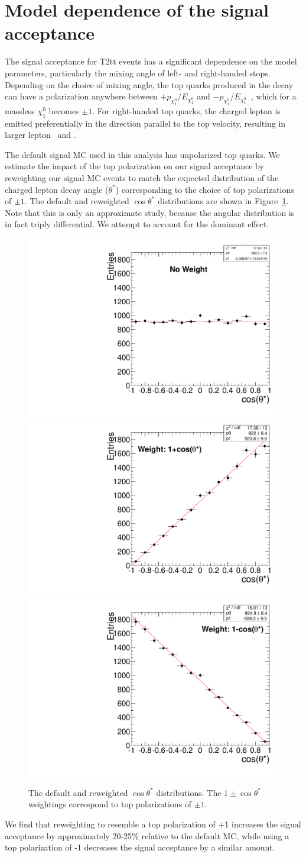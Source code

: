 \section{Model dependence of the signal acceptance}
\label{sec:modeldependence}

The signal acceptance for T2tt events has a significant dependence on the model parameters, particularly the mixing angle of left- and right-handed stops.
Depending on the choice of mixing angle, the top quarks produced in the decay can have a polarization anywhere between
$+p_{\chi_1^0}/E_{\chi_1^0}$ and $-p_{\chi_1^0}/E_{\chi_1^0}$~\cite{0811.1024}, which for a massless $\chi_1^0$ becomes $\pm 1$.
For right-handed top quarks, the charged lepton is emitted preferentially in the direction parallel to the top velocity, resulting in larger lepton \pt\ and \mt.

The default signal MC used in this analysis has unpolarized top quarks. We estimate the impact of the top polarization on our signal acceptance by reweighting
our signal MC events to match the expected distribution of the charged lepton decay angle ($\theta^{*}$) corresponding to the choice of top polarizations of $\pm 1$.
The default and reweighted $\cos\theta^{*}$ distributions are shown in Figure~\ref{fig:cosThetaStar}.
Note that this is only an approximate study, because the angular distribution is in fact triply differential. We attempt to account for the dominant effect.

\begin{figure}[hbt]
  \begin{center}
	\includegraphics[width=0.325\linewidth]{plots/costheta.pdf}
	\includegraphics[width=0.325\linewidth]{plots/costheta_1p.pdf}
	\includegraphics[width=0.325\linewidth]{plots/costheta_1m.pdf}
	\caption{
	  \label{fig:cosThetaStar}\protect 
          The default and reweighted $\cos\theta^{*}$ distributions. The $1 \pm \cos\theta^{*}$ weightings correspond to top polarizations of $\pm 1$.}
  \end{center}
\end{figure}

We find that reweighting to resemble a top polarization of +1 increases the signal acceptance by approximately 20-25\% relative to the default MC,
while using a top polarization of -1 decreases the signal acceptance by a similar amount. 